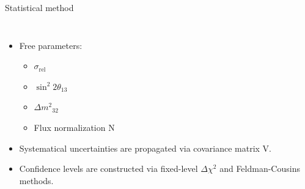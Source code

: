 \documentclass[usenames, dvipsnames]{beamer}
\newcommand{\Dm}{\ensuremath{\Delta m^2}}
\newcommand{\Important}{\textcolor{BrickRed}}
\newcommand{\impitem}{\item[\Important{$\bullet$}]}
\newcommand{\srel}{\ensuremath{\sigma_{\text{rel}}}}
\begin{document}
\begin{frame}[fragile]
\begin{columns}[T]
\begin{column}{.47\textwidth}
\begin{block}{Statistical method}
\begin{columns}[T]
\begin{column}{0.5\textwidth}
\begin{equation*}
                    \end{equation*} 
            \vspace*{-1.85cm}
            {\hskip-1cm{
            \begin{itemize}
                \item Free parameters:
                    \begin{itemize}
                    \impitem \Important{\srel}
                    \impitem \Important{\ensuremath{\sin^2 2\theta_{13}}}
                    \impitem \Important{\ensuremath{\Dm_{32}}}
                    \impitem Flux normalization \Important{N}
                    \end{itemize}
                \item Systematical uncertainties are propagated via covariance
                    matrix \Important{V}.
                    \impitem Confidence levels are constructed via \Important{fixed-level
                        \ensuremath{\Delta \chi^2}} and 
                        \Important{Feldman-Cousins} methods.
            \end{itemize}
        }
        }
        \end{column}
    \end{columns}
\end{block}


\end{column}
\end{columns}
\end{frame}
\end{document}
